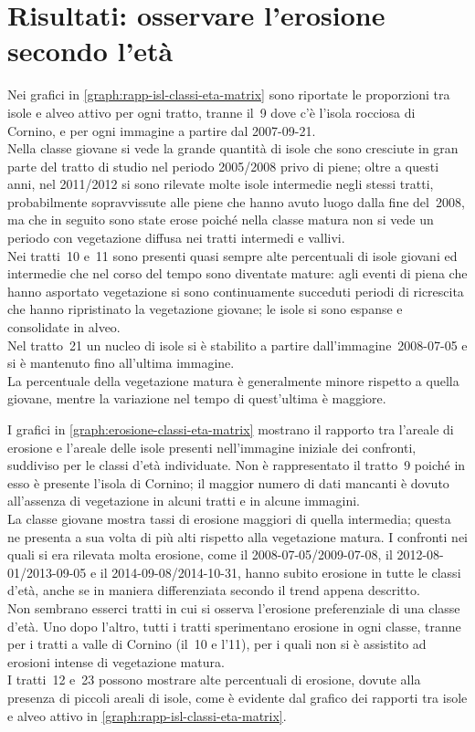 \section{Risultati: osservare l'erosione secondo l'età}
Nei grafici in \cref{graph:rapp-isl-classi-eta-matrix} sono riportate le proporzioni tra isole e alveo attivo per ogni tratto, tranne il~9 dove c'è l'isola rocciosa di Cornino, e per ogni immagine a partire dal 2007-09-21.
\\
Nella classe giovane si vede la grande quantità di isole che sono cresciute in gran parte del tratto di studio nel periodo 2005/2008 privo di piene; oltre a questi anni, nel 2011/2012 si sono rilevate molte isole intermedie negli stessi tratti, probabilmente sopravvissute alle piene che hanno avuto luogo dalla fine del~2008, ma che in seguito sono state erose poiché nella classe matura non si vede un periodo con vegetazione diffusa nei tratti intermedi e vallivi.
\\
Nei tratti~10 e~11 sono presenti quasi sempre alte percentuali di isole giovani ed intermedie che nel corso del tempo sono diventate mature: agli eventi di piena che hanno asportato vegetazione si sono continuamente succeduti periodi di ricrescita che hanno ripristinato la vegetazione giovane; le isole si sono espanse e consolidate in alveo.
\\
Nel tratto~21 un nucleo di isole si è stabilito a partire dall'immagine~2008-07-05 e si è mantenuto fino all'ultima immagine.
\\
La percentuale della vegetazione matura è generalmente minore rispetto a quella giovane, mentre la variazione nel tempo di quest'ultima è maggiore.

I grafici in \cref{graph:erosione-classi-eta-matrix} mostrano il rapporto tra l'areale di erosione e l'areale delle isole presenti nell'immagine iniziale dei confronti, suddiviso per le classi d'età individuate.
Non è rappresentato il tratto~9 poiché in esso è presente l'isola di Cornino; il maggior numero di dati mancanti è dovuto all'assenza di vegetazione in alcuni tratti e in alcune immagini.
\\
La classe giovane mostra tassi di erosione maggiori di quella intermedia; questa ne presenta a sua volta di più alti rispetto alla vegetazione matura.
I confronti nei quali si era rilevata molta erosione, come il 2008-07-05/2009-07-08, il 2012-08-01/2013-09-05 e il 2014-09-08/2014-10-31, hanno subito erosione in tutte le classi d'età, anche se in maniera differenziata secondo il trend appena descritto.
\\
Non sembrano esserci tratti in cui si osserva l'erosione preferenziale di una classe d'età. Uno dopo l'altro, tutti i tratti sperimentano erosione in ogni classe, tranne per i tratti a valle di Cornino (il~10 e l'11), per i quali non si è assistito ad erosioni intense di vegetazione matura.
\\
I tratti~12 e~23 possono mostrare alte percentuali di erosione, dovute alla presenza di piccoli areali di isole, come è evidente dal grafico dei rapporti tra isole e alveo attivo in \cref{graph:rapp-isl-classi-eta-matrix}.

